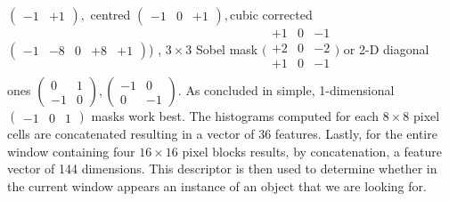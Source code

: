 $
(
\begin{smallmatrix}
	-1 & +1
\end{smallmatrix}), 
$
centred 
$(
\begin{smallmatrix}
-1 & 0 & +1
\end{smallmatrix}),
$cubic corrected
$
 ( 
\begin{smallmatrix}
	-1 & -8 & 0 & +8 & +1
\end{smallmatrix})
$)
, $3\times3$ Sobel mask
$
\bigl(
\begin{smallmatrix}
	+1 & 0 & -1 \\
	+2 & 0 & -2 \\
	+1 & 0 & -1 \\
\end{smallmatrix}
\bigr)
$ or 2-D diagonal ones 
$
(
\begin{smallmatrix}
	 0 & 1\\
    -1 & 0
\end{smallmatrix}
),
(
\begin{smallmatrix}
	-1 & 0\\
	 0 & -1
\end{smallmatrix}
)
$. As concluded in \cite{DalalTriggs05} simple, 1-dimensional $(\begin{smallmatrix}
-1 & 0 & 1
\end{smallmatrix})$ masks work best. The histograms computed for each $8\times8$ pixel cells are concatenated resulting in a vector of 36 features. Lastly, for the entire window containing four $16\times16$ pixel blocks results, by concatenation, a feature vector of 144 dimensions.
This descriptor is then used to determine whether in the current window appears an instance of an object that we are looking for.
